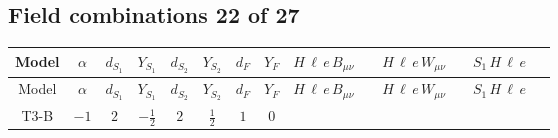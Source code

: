 \documentclass[8pt]{article}
\begin{document}
\begin{landscape}
\subsection*{Field combinations 22 of 27}
\begin{longtable}{@{}cccccccc >{\raggedright\arraybackslash}p{0.21\linewidth} >{\raggedright\arraybackslash}p{0.21\linewidth} >{\raggedright\arraybackslash}p{0.21\linewidth}@{}}
\toprule
Model & $\alpha$ & $d_{S_1}$ & $Y_{S_1}$ & $d_{S_2}$ & $Y_{S_2}$ & $d_F$ & $Y_F$ & $H\,\ell\,e\,B_{\mu\nu}$ & $H\,\ell\,e\,W_{\mu\nu}$ & $S_1\,H\,\ell\,e$ \\
\midrule
\endfirsthead
\toprule
Model & $\alpha$ & $d_{S_1}$ & $Y_{S_1}$ & $d_{S_2}$ & $Y_{S_2}$ & $d_F$ & $Y_F$ & $H\,\ell\,e\,B_{\mu\nu}$ & $H\,\ell\,e\,W_{\mu\nu}$ & $S_1\,H\,\ell\,e$ \\
\midrule
\endhead
T3-B & $-1$ & $2$ & $-\frac{1}{2}$ & $2$ & $\frac{1}{2}$ & $1$ & $0$ & \scriptsize\adjustbox{max width=\linewidth}{$\begin{gathered} +\frac{i \hbar  \overline{y_{1,i_3,r_1}} \overline{L_{a_1,i_2}}\, \gamma ^{\mu _1}\, P_R\, e_{i_1} B_{\mu _1\mu _2} H_{a_1} y_{1,i_2,r_1} Y_{e,i_3,i_1}}{48 m_1^2} \\ +\frac{i \hbar  \overline{y_{1,i_1,r_1}} \overline{Y_{e,i_3,i_2}} \overline{e_{i_2}}\, \gamma ^{\mu _1}\, P_L\, L_{a_1,i_1} B_{\mu _1\mu _2} y_{1,i_3,r_1} H_{a_1}{}^{\dagger }}{48 m_1^2}\end{gathered}$} & \scriptsize\adjustbox{max width=\linewidth}{$\begin{gathered} -\frac{i \hbar  \overline{y_{1,i_3,r_1}} \overline{L_{a_1,i_2}}\, \gamma ^{\mu _1}\, P_R\, e_{i_1} H_{a_2} y_{1,i_2,r_1} Y_{e,i_3,i_1} \text{gen}(\text{SU2L}(\text{fund}))_{A_1,a_1,a_2} W_{\mu _1\mu _2}^{A_1}}{24 m_1^2} \\ -\frac{i \hbar  \overline{y_{1,i_1,r_1}} \overline{Y_{e,i_3,i_2}} \overline{e_{i_2}}\, \gamma ^{\mu _1}\, P_L\, L_{a_2,i_1} y_{1,i_3,r_1} \text{gen}(\text{SU2L}(\text{fund}))_{A_1,a_1,a_2} W_{\mu _1\mu _2}^{A_1} H_{a_1}{}^{\dagger }}{24 m_1^2}\end{gathered}$} & \scriptsize\adjustbox{max width=\linewidth}{$\begin{gathered} +\frac{\hbar  \overline{L_{a_2,i_2}}\, P_R\, e_{i_1} H_{a_1} H_{a_2} Y_{e,i_2,i_1} H_{a_1}{}^{\dagger } \left(\lambda_{HS_1}^{(1)}^{(1)}\right){}^2}{12 m_1^2} \\ +\frac{\hbar  \overline{Y_{e,i_1,i_2}} \overline{e_{i_2}}\, P_L\, L_{a_1,i_1} H_{a_2} H_{a_1}{}^{\dagger } H_{a_2}{}^{\dagger } \left(\lambda_{HS_1}^{(1)}^{(1)}\right){}^2}{12 m_1^2} \\ +\frac{5 \hbar  \overline{L_{a_2,i_2}}\, P_R\, e_{i_1} H_{a_1} H_{a_2} Y_{e,i_2,i_1} H_{a_1}{}^{\dagger } \left(\lambda_{HS_1}^{(1)}^{(2)}\right){}^2}{36 m_1^2}\end{gathered}$} \\

\end{longtable}
\end{landscape}
\end{document}

